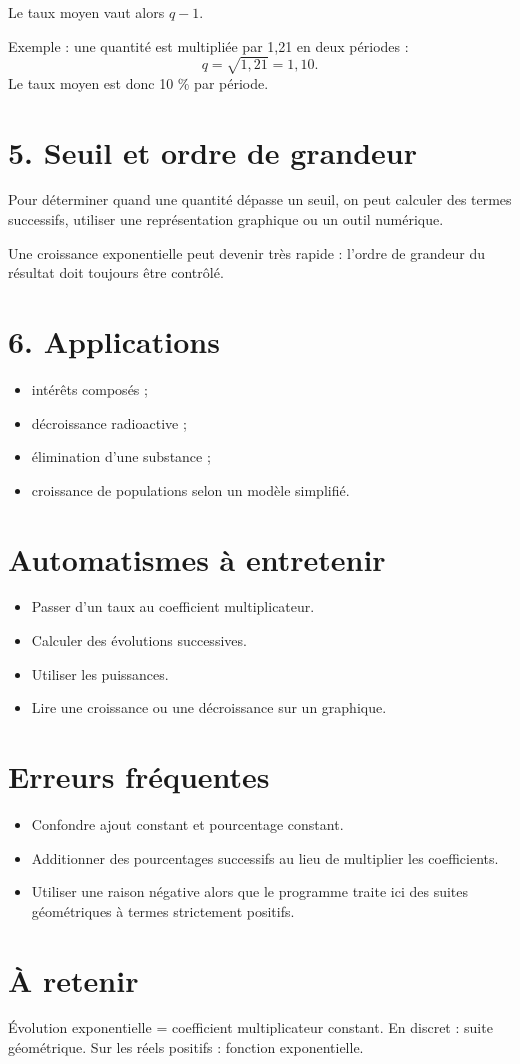 Le taux moyen vaut alors $q-1$.

Exemple : une quantité est multipliée par 1,21 en deux périodes :
\[
q=\sqrt{1{,}21}=1{,}10.
\]
Le taux moyen est donc 10 \% par période.

\section{5. Seuil et ordre de grandeur}
Pour déterminer quand une quantité dépasse un seuil, on peut calculer des termes successifs, utiliser une représentation graphique ou un outil numérique.

Une croissance exponentielle peut devenir très rapide : l'ordre de grandeur du résultat doit toujours être contrôlé.

\section{6. Applications}
\begin{itemize}
\item intérêts composés ;
\item décroissance radioactive ;
\item élimination d'une substance ;
\item croissance de populations selon un modèle simplifié.
\end{itemize}

\section{Automatismes à entretenir}
\begin{itemize}
\item Passer d'un taux au coefficient multiplicateur.
\item Calculer des évolutions successives.
\item Utiliser les puissances.
\item Lire une croissance ou une décroissance sur un graphique.
\end{itemize}

\section{Erreurs fréquentes}
\begin{itemize}
\item Confondre ajout constant et pourcentage constant.
\item Additionner des pourcentages successifs au lieu de multiplier les coefficients.
\item Utiliser une raison négative alors que le programme traite ici des suites géométriques à termes strictement positifs.
\end{itemize}

\section{À retenir}
Évolution exponentielle = coefficient multiplicateur constant. En discret : suite géométrique. Sur les réels positifs : fonction exponentielle.
